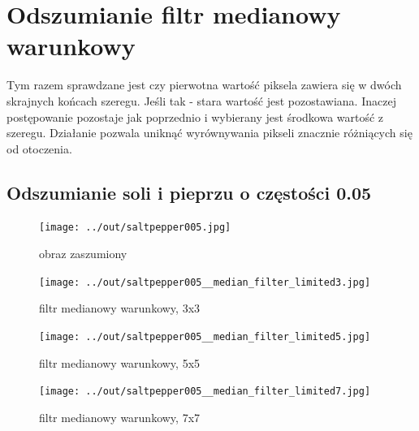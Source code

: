 \documentclass[a4paper,12pt]{article}
\begin{document}
\newpage
\section{Odszumianie filtr medianowy warunkowy}
Tym razem sprawdzane jest czy pierwotna wartość piksela zawiera się w dwóch skrajnych końcach szeregu. Jeśli tak - stara wartość jest pozostawiana. Inaczej postępowanie pozostaje jak poprzednio i wybierany jest środkowa wartość z szeregu. Działanie pozwala uniknąć wyrównywania pikseli znacznie różniących się od otoczenia.




\newpage
\subsection{Odszumianie soli i pieprzu o częstości 0.05}
\begin{figure}[h!]
\begin{minipage}[t]{7.5cm}
\begin{center}
\texttt{[image: ../out/saltpepper005.jpg]}
\caption{obraz zaszumiony}
\end{center}
\end{minipage}
\hfill
\begin{minipage}[t]{7.5cm}
\begin{center}
\texttt{[image: ../out/saltpepper005\_\_median\_filter\_limited3.jpg]}
\caption{filtr medianowy warunkowy, 3x3}
\end{center}
\end{minipage}
\end{figure}

\begin{figure}[h!]
\begin{minipage}[t]{7.5cm}
\begin{center}
\texttt{[image: ../out/saltpepper005\_\_median\_filter\_limited5.jpg]}
\caption{filtr medianowy warunkowy, 5x5}
\end{center}
\end{minipage}
\hfill
\begin{minipage}[t]{7.5cm}
\begin{center}
\texttt{[image: ../out/saltpepper005\_\_median\_filter\_limited7.jpg]}
\caption{filtr medianowy warunkowy, 7x7}
\end{center}
\end{minipage}
\end{figure}
\end{document}
